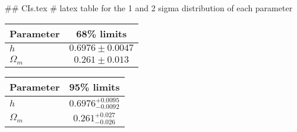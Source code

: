 ## CIs.tex
# latex table for the 1 and 2 sigma distribution of each parameter

\begin{tabular} { l  c}
 Parameter &  68\% limits\\
\hline
{\boldmath$h              $} & $0.6976\pm 0.0047          $\\
{\boldmath$\Omega_m       $} & $0.261\pm 0.013            $\\
\hline
\end{tabular}

\begin{tabular} { l  c}
 Parameter &  95\% limits\\
\hline
{\boldmath$h              $} & $0.6976^{+0.0095}_{-0.0092}$\\
{\boldmath$\Omega_m       $} & $0.261^{+0.027}_{-0.026}   $\\
\hline
\end{tabular}
